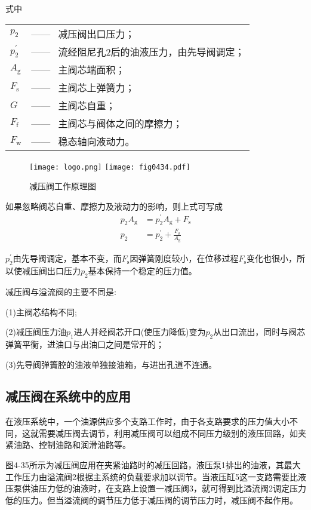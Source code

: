 \noindent 式中\ 
\begin{tabular}[t]{ll}
$p_{2}$ &—— \ 减压阀出口压力；\\
$p^{'}_{2}$ &—— \ 流经阻尼孔2后的油液压力，由先导阀调定；\\
$A_\text{g}$ &—— \ 主阀芯端面积；\\
$F_\text{s}$ &—— \ 主阀芯上弹簧力；\\
$G$ &—— \ 主阀芯自重；\\
$F_\text{f}$ &—— \ 主阀芯与阀体之间的摩擦力；\\
$F_\text{w}$ &—— \ 稳态轴向液动力。
\end{tabular}  

\begin{figure}[!hbt]
\centering
\ifOpenSource
\texttt{[image: logo.png]}
\else
\texttt{[image: fig0434.pdf]}
\fi
\caption{减压阀工作原理图}
\label{fig:fig0434}
\end{figure}

如果忽略阀芯自重、摩擦力及液动力的影响，则上式可写成
\begin{equation}
\begin{split}
p_{2}A_\text{g}& =p^{'}_{2}A_\text{g}+F_\text{s}\\
p_{2}& =p^{'}_{2}+\frac{F_\text{s}}{A_\text{g}}
\end{split}
\end{equation}

$p^{'}_2$由先导阀调定，基本不变，而$F_\text{s}$因弹簧刚度较小，在位移过程$F_\text{s}$变化也很小，所以使减压阀出口压力$p_{2}$基本保持一个稳定的压力值。

减压阀与溢流阀的主要不同是:

(1)主阀芯结构不同;

(2)减压阀压力油$p_{1}$进人并经阀芯开口(使压力降低)变为$p_{2}$从出口流出，同时与阀芯弹簧平衡，进油口与出油口之间是常开的；

(3)先导阀弹簀腔的油液单独接油箱，与进出孔道不连通。

\subsection{减压阀在系统中的应用}

在液压系统中，一个油源供应多个支路工作时，由于各支路要求的压力值大小不同，这就需要减压阀去调节，利用减压阀可以组成不同压力级别的液压回路，如夹紧油路、控制油路和润滑油路等。

图4-35所示为减压阀应用在夹紧油路时的减压回路，液压泵1排出的油液，其最大工作压力由溢流阀2根据主系统的负载要求加以调节。当液压缸5这一支路需要比液压泵供油压力低的油液时，在支路上设置一减压阀3，就可得到比溢流阀2调定压力低的压力。但当溢流阀的调节压力低于减压阀的调节压力时，减压阀不起作用。

